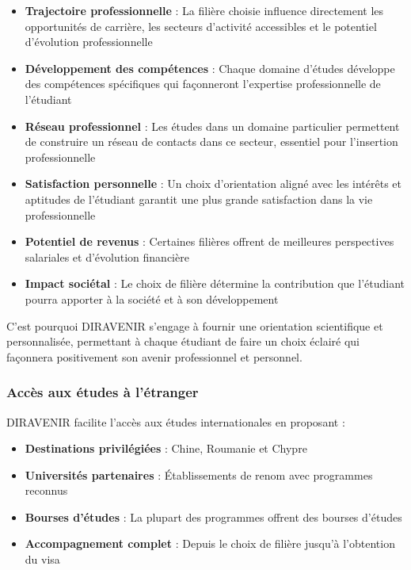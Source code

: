\documentclass[12pt,a4paper]{report}
\begin{document}
\begin{itemize}
    \item \textbf{Trajectoire professionnelle} : La filière choisie influence directement les opportunités de carrière, les secteurs d'activité accessibles et le potentiel d'évolution professionnelle
    \item \textbf{Développement des compétences} : Chaque domaine d'études développe des compétences spécifiques qui façonneront l'expertise professionnelle de l'étudiant
    \item \textbf{Réseau professionnel} : Les études dans un domaine particulier permettent de construire un réseau de contacts dans ce secteur, essentiel pour l'insertion professionnelle
    \item \textbf{Satisfaction personnelle} : Un choix d'orientation aligné avec les intérêts et aptitudes de l'étudiant garantit une plus grande satisfaction dans la vie professionnelle
    \item \textbf{Potentiel de revenus} : Certaines filières offrent de meilleures perspectives salariales et d'évolution financière
    \item \textbf{Impact sociétal} : Le choix de filière détermine la contribution que l'étudiant pourra apporter à la société et à son développement
\end{itemize}

C'est pourquoi DIRAVENIR s'engage à fournir une orientation scientifique et personnalisée, permettant à chaque étudiant de faire un choix éclairé qui façonnera positivement son avenir professionnel et personnel.

\subsubsection{Accès aux études à l'étranger}

DIRAVENIR facilite l'accès aux études internationales en proposant :
\begin{itemize}
    \item \textbf{Destinations privilégiées} : Chine, Roumanie et Chypre
    \item \textbf{Universités partenaires} : Établissements de renom avec programmes reconnus
    \item \textbf{Bourses d'études} : La plupart des programmes offrent des bourses d'études
    \item \textbf{Accompagnement complet} : Depuis le choix de filière jusqu'à l'obtention du visa
\end{itemize}
\end{document}
